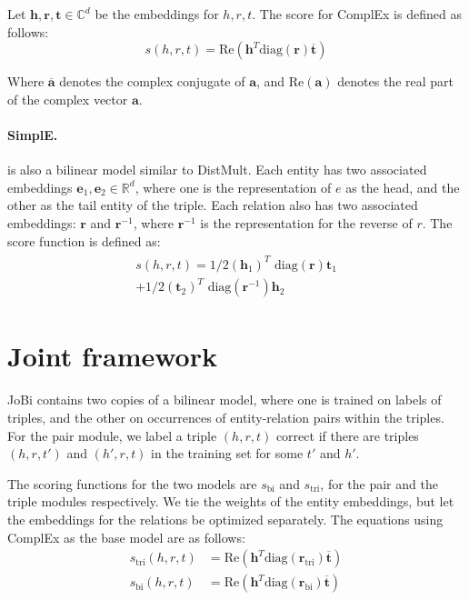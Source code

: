 \documentclass[11pt,a4paper, dvipsnames]{article}
\def\va{{\bm{a}}}
\def\ve{{\bm{e}}}
\def\vh{{\bm{h}}}
\def\vr{{\bm{r}}}
\def\vt{{\bm{t}}}
\def\sC{{\mathbb{C}}}
\newcommand{\R}{\mathbb{R}}
\begin{document}
 Let $\vh, \vr, \vt \in \sC^d$ be the embeddings for $h, r, t$. The score for ComplEx is defined as follows:
\begin{equation}
s(h, r, t) = \text{Re}\left(\vh^T \text{diag}(\vr)  \overline{\vt}\right)
\end{equation}

Where $\overline{\va}$ denotes the complex conjugate of $\va$, and $\text{Re}(\va)$ denotes the real part of the complex vector $\va$.

\paragraph{SimplE.} \citep{Kazemi2018SimplEGraphs} is also a bilinear model similar to DistMult. Each entity has two associated embeddings $\ve_1, \ve_2 \in \R^d$, where one is the representation of $e$ as the head, and the other as the tail entity of the triple. Each relation also has two associated embeddings: $\vr$ and $\vr^{-1}$, where $\vr^{-1}$ is the representation for the reverse of $r$. The score function is defined as: 
\begin{align}
\begin{split}
 s(h, r, t) = 1/2  \left(\vh_{1} \right)^T \text{ diag}(\vr) \vt_1 \\ + 1/2 \left(\vt_2\right)^T \text{ diag}(\vr^{-1}) \vh_2
\end{split}
\end{align}











 
 \section{Joint framework} JoBi contains two copies of a bilinear model, where one is trained on labels of triples, and the other on occurrences of entity-relation pairs within the triples. For the pair module, we label a triple $(h,r,t)$ correct if there are triples $(h, r, t')$ and $(h', r, t)$ in the training set for some $t'$ and $h'$. 
 
 The scoring functions for the two models are $s_{\text{bi}}$ and $s_{\text{tri}}$, for the pair and the triple modules respectively. We tie the weights of the entity embeddings, but let the embeddings for the relations be optimized separately. The equations using ComplEx as the base model are as follows:
 \begin{align}
    s_{\text{tri}}(h, r, t) &= \text{Re}\left(\vh^T \text{diag}(\vr_{\text{tri}})  \overline{\vt}\right) \\
    s_{\text{bi}}(h, r, t) &= \text{Re}\left(\vh^T \text{diag}(\vr_{\text{bi}})  \overline{\vt}\right) 
\end{align}
\end{document}
